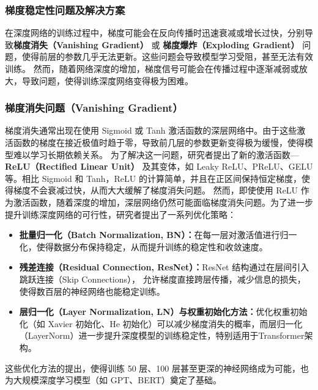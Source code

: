 
\subsubsection{梯度稳定性问题及解决方案}


在深度网络的训练过程中，梯度可能会在反向传播时迅速衰减或增长过快，分别导致{\bf 梯度消失（Vanishing Gradient）} 或 {\bf 梯度爆炸（Exploding Gradient）} 问题，使得前层的参数几乎无法更新。这些问题会导致模型学习受阻，甚至无法有效训练。
然而，随着网络深度的增加，梯度信号可能会在传播过程中逐渐减弱或放大，导致问题，使得训练深度网络变得极为困难。
\subsubsection{梯度消失问题（Vanishing Gradient）}


梯度消失通常出现在使用 Sigmoid 或 Tanh 激活函数的深层网络中。由于这些激活函数的梯度在接近极值时趋于零，导致前几层的参数更新变得极为缓慢，使得模型难以学习长期依赖关系。
为了解决这一问题，研究者提出了新的激活函数---{\bf  ReLU（Rectified Linear Unit）} 及其变体，如 Leaky ReLU、PReLU、GELU 等。相比 Sigmoid 和 Tanh，ReLU 的计算简单，并且在正区间保持恒定梯度，使得梯度不会衰减过快，从而大大缓解了梯度消失问题。
然而，即使使用 ReLU 作为激活函数，随着深度的增加，深层网络仍然可能面临梯度消失问题。为了进一步提升训练深度网络的可行性，研究者提出了一系列优化策略：
\begin{itemize}
\item {\bf  批量归一化（Batch Normalization, BN）：}在每一层对激活值进行归一化，使得数据分布保持稳定，从而提升训练的稳定性和收敛速度。
\item {\bf  残差连接（Residual Connection, ResNet）：}ResNet 结构通过在层间引入跳跃连接（Skip Connections）， 允许梯度直接跨层传播，减少信息的损失，使得数百层的神经网络也能稳定训练。
\item {\bf  层归一化（Layer Normalization, LN）与权重初始化方法：}优化权重初始化（如 Xavier 初始化、He 初始化）可以减少梯度消失的概率，而层归一化（LayerNorm）进一步提升深度模型的训练稳定性，特别适用于Transformer架构。


\end{itemize}
这些优化方法的提出，使得训练 50 层、100 层甚至更深的神经网络成为可能，也为大规模深度学习模型（如 GPT、BERT）奠定了基础。
